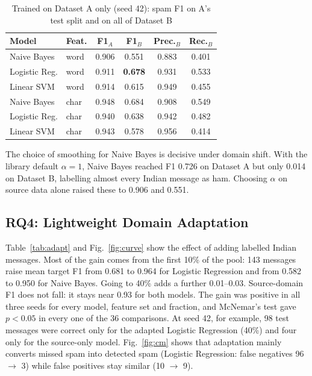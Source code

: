 \documentclass[conference]{IEEEtran}
\begin{document}
\begin{table}[t]
\centering
\caption{Trained on Dataset A only (seed 42): spam F1 on A's test split and on all of Dataset B}
\label{tab:cross}
\begin{tabular}{llcccc}
\toprule
Model & Feat. & F1$_A$ & F1$_B$ & Prec.$_B$ & Rec.$_B$ \\
\midrule
Naive Bayes & word & 0.906 & 0.551 & 0.883 & 0.401 \\
Logistic Reg. & word & 0.911 & \textbf{0.678} & 0.931 & 0.533 \\
Linear SVM & word & 0.914 & 0.615 & 0.949 & 0.455 \\
Naive Bayes & char & 0.948 & 0.684 & 0.908 & 0.549 \\
Logistic Reg. & char & 0.940 & 0.638 & 0.942 & 0.482 \\
Linear SVM & char & 0.943 & 0.578 & 0.956 & 0.414 \\
\bottomrule
\end{tabular}
\end{table}

The choice of smoothing for Naive Bayes is decisive under domain shift. With the library default $\alpha=1$, Naive Bayes reached F1 0.726 on Dataset A but only 0.014 on Dataset B, labelling almost every Indian message as ham. Choosing $\alpha$ on source data alone raised these to 0.906 and 0.551.

\subsection{RQ4: Lightweight Domain Adaptation}
Table~\ref{tab:adapt} and Fig.~\ref{fig:curve} show the effect of adding labelled Indian messages. Most of the gain comes from the first 10\% of the pool: 143 messages raise mean target F1 from 0.681 to 0.964 for Logistic Regression and from 0.582 to 0.950 for Naive Bayes. Going to 40\% adds a further 0.01--0.03. Source-domain F1 does not fall: it stays near 0.93 for both models. The gain was positive in all three seeds for every model, feature set and fraction, and McNemar's test gave $p<0.05$ in every one of the 36 comparisons. At seed 42, for example, 98 test messages were correct only for the adapted Logistic Regression (40\%) and four only for the source-only model. Fig.~\ref{fig:cm} shows that adaptation mainly converts missed spam into detected spam (Logistic Regression: false negatives 96 $\to$ 3) while false positives stay similar (10 $\to$ 9).
\end{document}
